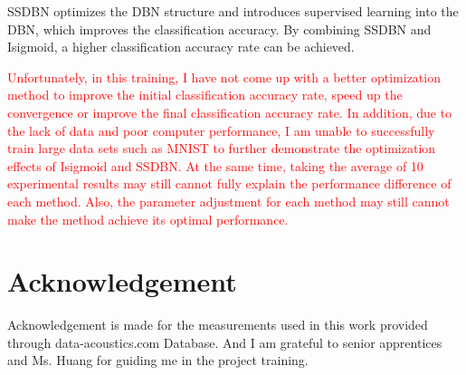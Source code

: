 \documentclass{modified}
\begin{document}
SSDBN optimizes the DBN structure and introduces supervised learning into the DBN, which improves the classification accuracy. By combining SSDBN and Isigmoid, a higher classification accuracy rate can be achieved.

\textcolor{red}{Unfortunately, in this training, I have not come up with a better optimization method to improve the initial classification accuracy rate, speed up the convergence or improve the final classification accuracy rate. In addition, due to the lack of data and poor computer performance, I am unable to successfully train large data sets such as MNIST to further demonstrate the optimization effects of Isigmoid and SSDBN. At the same time, taking the average of 10 experimental results may still cannot fully explain the performance difference of each method. Also, the parameter adjustment for each method may still cannot make the method achieve its optimal performance.}


\section*{Acknowledgement}
Acknowledgement is made for the measurements used in this work provided through data-acoustics.com Database. And I am grateful to senior apprentices and Ms. Huang for guiding me in the project training.




 
\end{document}
